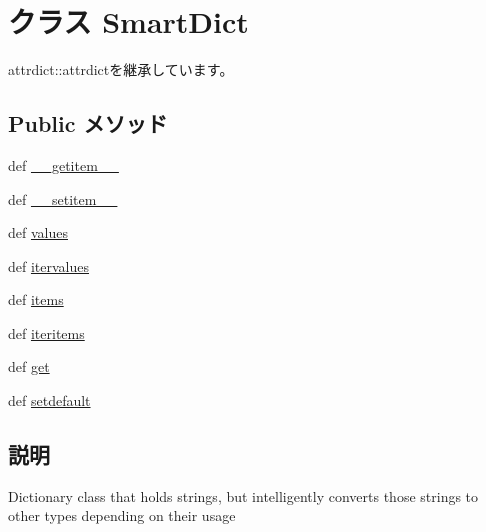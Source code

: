\hypertarget{classm5_1_1util_1_1smartdict_1_1SmartDict}{
\section{クラス SmartDict}
\label{classm5_1_1util_1_1smartdict_1_1SmartDict}
}


attrdict::attrdictを継承しています。\subsection*{Public メソッド}
\begin{DoxyCompactItemize}
\item 
def \hyperlink{classm5_1_1util_1_1smartdict_1_1SmartDict_a50d766f4276c3d8fe330ac8cd344a75f}{\_\-\_\-getitem\_\-\_\-}
\item 
def \hyperlink{classm5_1_1util_1_1smartdict_1_1SmartDict_a09195b01147e970ca71c48b57f653940}{\_\-\_\-setitem\_\-\_\-}
\item 
def \hyperlink{classm5_1_1util_1_1smartdict_1_1SmartDict_abb73a0060caeba53780d972f37623f1e}{values}
\item 
def \hyperlink{classm5_1_1util_1_1smartdict_1_1SmartDict_aeb6e8630a10560ad0d4b34377c790f19}{itervalues}
\item 
def \hyperlink{classm5_1_1util_1_1smartdict_1_1SmartDict_a717291221885735d6870d7179083ec07}{items}
\item 
def \hyperlink{classm5_1_1util_1_1smartdict_1_1SmartDict_a13d39839ad1cfd4c47f524735933c0bf}{iteritems}
\item 
def \hyperlink{classm5_1_1util_1_1smartdict_1_1SmartDict_a444a1328efb32d5d9d2dcb2efe855d3b}{get}
\item 
def \hyperlink{classm5_1_1util_1_1smartdict_1_1SmartDict_a1af96fe42a8e8c54a0c606fb4f01df98}{setdefault}
\end{DoxyCompactItemize}


\subsection{説明}
\begin{DoxyVerb}Dictionary class that holds strings, but intelligently converts
those strings to other types depending on their usage\end{DoxyVerb}
 

